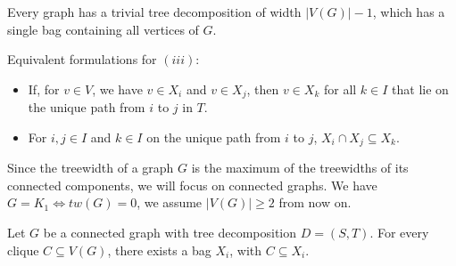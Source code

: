 \begin{definition}
\begin{center}
    \end{center}

\end{definition}
\begin{remark}\label{8.2}
    Every graph has a trivial tree decomposition of width $|V(G)|-1$, which has a single bag containing all vertices of $G$.
\end{remark}
\begin{remark}\label{8.3}
    Equivalent formulations for $(iii)$:
    \begin{itemize}
        \item [(iii')] If, for $v\in V$, we have $v\in X_i$ and $v\in X_j$, then $v\in X_k$ for all $k\in I$ that lie on the unique path from $i$ to $j$ in $T$.
        \item [(iii'')] For $i,j\in I$ and $k\in I$ on the unique path from $i$ to $j$, $X_i\cap X_j\subseteq X_k$.
    \end{itemize}
    Since the treewidth of a graph $G$ is the maximum of the treewidths of its connected components, we will focus on connected graphs. We have $G=K_1\iff tw(G)=0$, we assume $|V(G)|\geq 2$ from now on.
\end{remark}
\begin{lemma}\label{8.4}
    Let $G$ be a connected graph with tree decomposition $D=(S,T)$. For every clique $C\subseteq V(G)$, there exists a bag $X_i$, with $C\subseteq X_i$.
\end{lemma}
